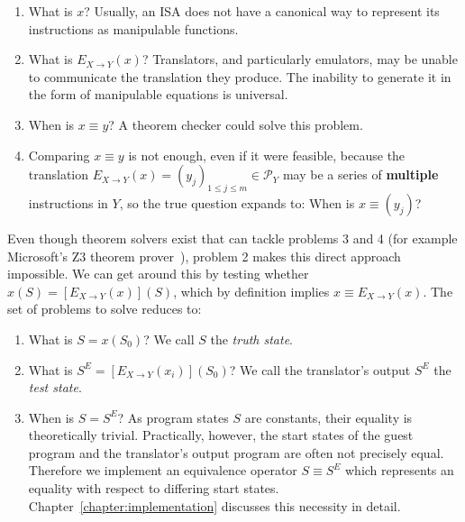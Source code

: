 \begin{enumerate}
    \item What is $x$? Usually, an \ac{ISA} does not have a canonical way to represent its instructions as manipulable
        functions.
    \item What is $E_{X \rightarrow Y}(x)$? Translators, and particularly emulators, may be unable to communicate the
        translation they produce. The inability to generate it in the form of manipulable equations is universal.
    \item When is $x \equiv y$? A theorem checker could solve this problem.
    \item Comparing $x \equiv y$ is not enough, even if it were feasible, because the translation $E_{X \rightarrow
        Y}(x) = (y_j)_{1 \leq j \leq m} \in \mathcal{P}_Y$ may be a series of \textbf{multiple} instructions in $Y$, so
        the true question expands to: When is $x \equiv (y_j)$?
\end{enumerate}

Even though theorem solvers exist that can tackle problems 3 and 4 (for example Microsoft's Z3 theorem
prover~\cite{Z3prover2024Mar}), problem 2 makes this direct approach impossible. We can get around this by testing
whether $x(S) = [E_{X \rightarrow Y}(x)](S)$, which by definition implies $x \equiv E_{X \rightarrow Y}(x)$. The set of
problems to solve reduces to:

\begin{enumerate}
    \item What is $S = x(S_0)$? We call $S$ the \textit{truth state}.
    \item What is $S^E = [E_{X \rightarrow Y}(x_i)](S_0)$? We call the translator's output $S^E$ the \textit{test state}.
    \item When is $S = S^E$? As program states $S$ are constants, their equality is theoretically trivial. Practically,
        however, the start states of the guest program and the translator's output program are often not precisely
        equal. Therefore we implement an equivalence operator $S \equiv S^E$ which represents an equality with respect
        to differing start states. Chapter~\ref{chapter:implementation} discusses this necessity in detail.
\end{enumerate}
